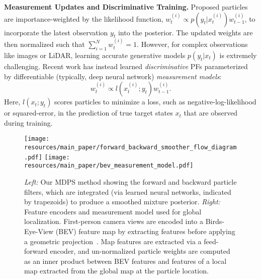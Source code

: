     \textbf{Measurement Updates and Discriminative Training.}  Proposed particles are importance-weighted by the likelihood function, $w_t^{(i)} \propto p(y_t | x_t^{(i)})w_{t-1}^{(i)}$, to incorporate the latest observation $y_t$ into the posterior. 
    The updated weights are then normalized such that $\sum_{i=1}^{N} w_t^{(i)} = 1$. %
    However, for complex observations like images or LiDAR, learning accurate generative models $p(y_t|x_t)$ is extremely challenging. Recent work \cite{9635972GausePF, pmlr-v139-corenflos21a_optimal_transport, pmlr-v87-karkus18a_soft_resampling, younis2023mdpf, jonschkowski18_differentiable_particle_filter} has instead learned \emph{discriminative} PFs parameterized by differentiable (typically, deep neural network) \textit{measurement models}:
    \begin{equation}
        w_t^{(i)} \propto l(x_t^{(i)};y_t)w_{t-1}^{(i)}.
    \end{equation}
    Here, $l(x_t;y_t)$ scores particles to minimize a loss, such as negative-log-likelihood or squared-error, in the prediction of true target states $x_t$ that are observed during training.


            \begin{figure}[t]
        \centering
        \texttt{[image: resources/main\_paper/forward\_backward\_smoother\_flow\_diagram.pdf]}
        \hspace{0.45in}
        \texttt{[image: resources/main\_paper/bev\_measurement\_model.pdf]}
        \vskip -0.03in
         \caption{\small{\emph{Left:} Our MDPS method showing the forward and backward particle filters, which are integrated (via learned neural networks, indicated by trapezoids) to produce a smoothed mixture posterior.
         \emph{Right:} Feature encoders and measurement model used for global localization. First-person camera views are encoded into a Birds-Eye-View (BEV) feature map by extracting features before applying a geometric projection~\citep{sarlin2023orienternet}. Map features are extracted via a feed-forward encoder, and un-normalized particle weights are computed as an inner product between BEV features and features of a local map extracted from the global map at the particle location.}}
         \label{fig:forward_backward_smoother_flow_diagram}
        \vskip -0.1in
    \end{figure}

